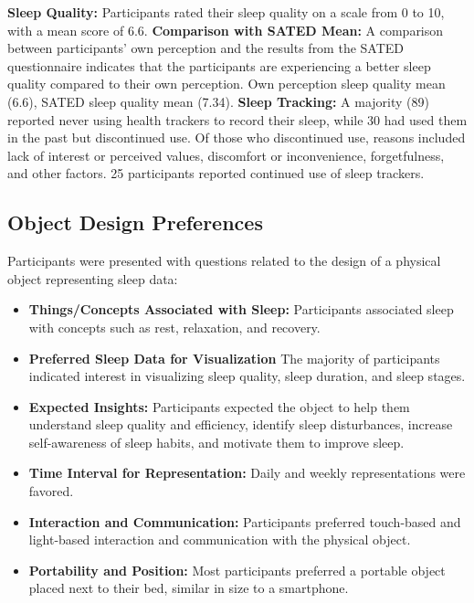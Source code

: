 \documentclass[
  a4paper,  %
  twoside,  %
  bibliography=totoc,
  headsepline,
  cleardoublepage=empty,
  parskip=half,
  draft=false
]{scrbook}
\begin{document}
    

    \textbf{Sleep Quality:} Participants rated their sleep quality on a scale from 0 to 10, with a mean score of 6.6.
    \textbf{Comparison with SATED Mean:} A comparison between participants' own perception and the results from the SATED questionnaire indicates that the participants are experiencing a better sleep quality compared to their own perception. Own perception sleep quality mean (6.6), SATED sleep quality mean (7.34).
    \textbf{Sleep Tracking:} A majority (89) reported never using health trackers to record their sleep, while 30 had used them in the past but discontinued use. Of those who discontinued use, reasons included lack of interest or perceived values, discomfort or inconvenience, forgetfulness, and other factors. 25 participants reported continued use of sleep trackers.


\subsection{Object Design Preferences}
    Participants were presented with questions related to the design of a physical object representing sleep data:

    \begin{itemize}
        \item \textbf{Things/Concepts Associated with Sleep:} Participants associated sleep with concepts such as rest, relaxation, and recovery.
        \item \textbf{Preferred Sleep Data for Visualization} The majority of participants indicated interest in visualizing sleep quality, sleep duration, and sleep stages.
        \item \textbf{Expected Insights:} Participants expected the object to help them understand sleep quality and efficiency, identify sleep disturbances, increase self-awareness of sleep habits, and motivate them to improve sleep.
        \item \textbf{Time Interval for Representation:} Daily and weekly representations were favored.
        \item \textbf{Interaction and Communication:} Participants preferred touch-based and light-based interaction and communication with the physical object.
        \item \textbf{Portability and Position:} Most participants preferred a portable object placed next to their bed, similar in size to a smartphone.
    \end{itemize}
\end{document}
